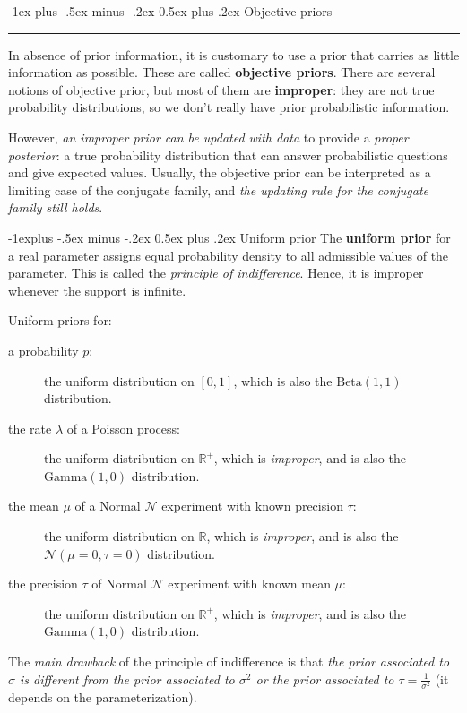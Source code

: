 \documentclass[10pt,landscape]{article}
\makeatletter
\newcommand{\R}{\mathbb{R}}
\newcommand{\N}{\mathcal{N}}
\newcommand{\Beta}{\textrm{Beta}}
\newcommand{\Gam}{\textrm{Gamma}}
\renewcommand{\section}{\@startsection{section}{1}{0mm}%
                                {-1ex plus -.5ex minus -.2ex}%
                                {0.5ex plus .2ex}%
                                {\normalfont\large\bfseries}}
\renewcommand{\subsection}{\@startsection{subsection}{2}{0mm}%
                                {-1explus -.5ex minus -.2ex}%
                                {0.5ex plus .2ex}%
                                {\normalfont\normalsize\bfseries}}
\makeatother
\begin{document}
\begin{multicols*}{3}
\section{Objective priors} \smallskip \hrule height 2pt \smallskip
In absence of prior information, it is customary to use a prior that carries as little information as possible.
These are called \textbf{objective priors}.
There are several notions of objective prior, but most of them are \textbf{improper}: they are not true probability distributions, so we don't really have prior probabilistic information.

However, \emph{an improper prior can be updated with data} to provide a \emph{proper posterior}: a true probability distribution that can answer probabilistic questions and give expected values.
Usually, the objective prior can be interpreted as a limiting case of the conjugate family, and \emph{the updating rule for the conjugate family still holds}.

\subsection{Uniform prior}
The \textbf{uniform prior} for a real parameter assigns equal probability density to all admissible values of the parameter.
This is called the \emph{principle of indifference}.
Hence, it is improper whenever the support is infinite.

Uniform priors for:
\begin{description}
  \item [a probability $p$:] the uniform distribution on $[0,1]$, which is also the $\Beta(1,1)$ distribution.
  \item [the rate $\lambda$ of a Poisson process:] the uniform distribution on $\R^+$, which is \emph{improper}, and is also the $\Gam(1,0)$ distribution.
  \item [the mean $\mu$ of a Normal $\N$ experiment with known precision $\tau$:] the uniform distribution on $\R$, which is \emph{improper}, and is also the $\N(\mu=0,\tau=0)$ distribution.
  \item [the precision $\tau$ of Normal $\N$ experiment with known mean $\mu$:] the uniform distribution on $\R^+$, which is \emph{improper}, and is also the $\Gam(1,0)$ distribution.
\end{description}

The \emph{main drawback} of the principle of indifference is that \emph{the prior associated to $\sigma$ is different from the prior associated to $\sigma^2$ or the prior associated to $\tau=\frac{1}{\sigma^2}$} (it depends on the parameterization).


\end{multicols*}
\end{document}
